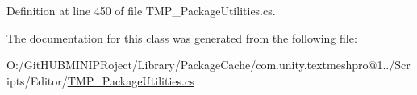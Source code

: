 Definition at line 450 of file T\+M\+P\+\_\+\+Package\+Utilities.\+cs.



The documentation for this class was generated from the following file\+:\begin{DoxyCompactItemize}
\item 
O\+:/\+Git\+H\+U\+B\+M\+I\+N\+I\+P\+Roject/\+Library/\+Package\+Cache/com.\+unity.\+textmeshpro@1../\+Scripts/\+Editor/\mbox{\hyperlink{_t_m_p___package_utilities_8cs}{T\+M\+P\+\_\+\+Package\+Utilities.\+cs}}\end{DoxyCompactItemize}
